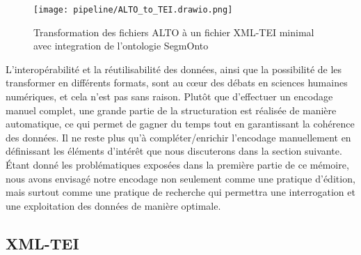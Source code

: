 \documentclass[a4paper, twoside, 12pt]{book}
\begin{document}
\begin{figure}[H]
    \centering
    \texttt{[image: pipeline/ALTO\_to\_TEI.drawio.png]}
    \caption{ Transformation des fichiers ALTO à un fichier XML-TEI minimal avec integration de l'ontologie SegmOnto }
\end{figure}


L'interopérabilité et la réutilisabilité des données, ainsi que la possibilité de les transformer en différents formats, sont au cœur des débats en sciences humaines numériques, et cela n'est pas sans raison. Plutôt que d'effectuer un encodage manuel complet, une grande partie de la structuration est réalisée de manière automatique, ce qui permet de gagner du temps tout en garantissant la cohérence des données. Il ne reste plus qu'à compléter/enrichir l'encodage manuellement en définissant les éléments d'intérêt que nous discuterons dans la section suivante. Étant donné les problématiques exposées dans la première partie de ce mémoire, nous avons envisagé notre encodage non seulement comme une pratique d'édition, mais surtout comme une pratique de recherche qui permettra une interrogation et une exploitation des données de manière optimale.

\subsection{XML-TEI}
\end{document}
